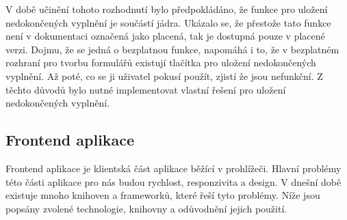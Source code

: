 V době učinění tohoto rozhodnutí bylo předpokládáno, že funkce pro uložení nedokončených vyplnění je součástí jádra.
Ukázalo se, že přestože tato funkce není v dokumentaci označená jako placená, tak je dostupná pouze v placené verzi.
Dojmu, že se jedná o bezplatnou funkce, napomáhá i to, že v bezplatném rozhraní pro tvorbu formulářů existují tlačítka pro uložení nedokončených vyplnění.
Až poté, co se ji uživatel pokusí použít, zjistí že jsou nefunkční.
Z těchto důvodů bylo nutné implementovat vlastní řešení pro uložení nedokončených vyplnění.

\subsection{Frontend aplikace}\label{subsec:frontend-aplikace}

Frontend aplikace je klientská část aplikace běžící v prohlížeči.
Hlavní problémy této části aplikace pro nás budou rychlost, responzivita a design.
V dnešní době existuje mnoho knihoven a frameworků, které řeší tyto problémy.
Níže jsou popsány zvolené technologie, knihovny a odůvodnění jejich použití.

